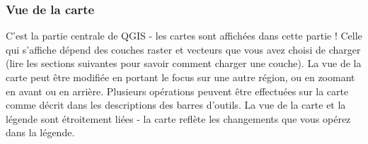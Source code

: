 
\subsubsection{Vue de la carte}\label{label_mapview}


C'est la partie centrale de QGIS - les cartes sont affich\'ees dans cette partie ! Celle qui s'affiche d\'epend des couches raster et vecteurs que vous avez choisi de charger (lire les sections suivantes pour savoir comment charger une couche). La vue de la carte peut \^etre modifi\'ee en portant le focus sur une autre r\'egion, ou en zoomant en avant ou en arri\`ere. Plusieurs op\'erations peuvent \^etre effectu\'ees sur la carte comme d\'ecrit dans les descriptions des barres d'outils. La vue de la carte et la l\'egende sont \'etroitement li\'ees - la carte refl\`ete les changements que vous op\'erez dans la l\'egende.


